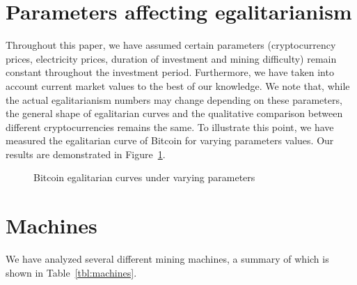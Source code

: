 \appendix
\section{Parameters affecting egalitarianism}\label{sec:appendix-qualitative-difference}

Throughout this paper, we have assumed certain parameters (cryptocurrency
prices, electricity prices, duration of investment and mining difficulty) remain
constant throughout the investment period. Furthermore, we have taken into account
current market values to the best of our knowledge. We note that, while the
actual egalitarianism numbers may change depending on these parameters, the
general shape of egalitarian curves and the qualitative comparison between
different cryptocurrencies remains the same. To illustrate this point, we have
measured the egalitarian curve of Bitcoin for varying parameters values. Our
results are demonstrated in Figure~\ref{fig:different-settings}.

\begin{figure}
  \caption{Bitcoin egalitarian curves under varying parameters}
  \label{fig:different-settings}
\end{figure}

\section{Machines}\label{sec:appendix-data}

We have analyzed several different mining machines, a summary of which is shown in Table~\ref{tbl:machines}.


